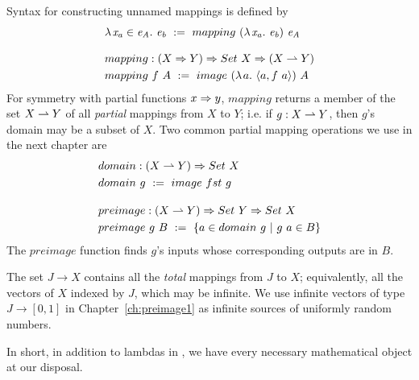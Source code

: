 Syntax for constructing unnamed mappings is defined by
\begin{align}
	&\fun{\mathit{x_a} \in \mathit{e_A}}{\mathit{e_b}} \ :=\ mapping~(\fun{\mathit{x_a}}\mathit{e_b})~\mathit{e_A} \\
\nonumber\\[-0.5\baselineskip]
	&\begin{aligned}
		&mapping : (X \tto Y) \tto Set~X \tto (X \pto Y) \\
		&mapping~f~A \ := \ image~(\fun{a}{\pair{a,f~a}})~A
	\end{aligned}
\end{align}
For symmetry with partial functions $x \Rightarrow y$, $mapping$ returns a member of the set $X \rightharpoonup Y$ of all \emph{partial} mappings from $X$ to $Y$; i.e. if $g : X \rightharpoonup Y$, then $g$'s domain may be a subset of $X$.
Two common partial mapping operations we use in the next chapter are
\begin{align}
	&\begin{aligned}
		&domain : (X \rightharpoonup Y) \Rightarrow Set~X \\
		&domain~g \ := \ image~fst~g
	\end{aligned} \\
\nonumber\\[-0.5\baselineskip]
	&\begin{aligned}
		&preimage : (X \rightharpoonup Y) \Rightarrow Set~Y \Rightarrow Set~X \\
		&preimage~g~B \ :=\ \lbrace {a \in domain~g} \ \lvert\ {g~a \in B} \rbrace
	\end{aligned}
\end{align}
The $preimage$ function finds $g$'s inputs whose corresponding outputs are in $B$.

The set $J \to X$ contains all the \emph{total} mappings from $J$ to $X$; equivalently, all the vectors of $X$ indexed by $J$, which may be infinite.
We use infinite vectors of type $J \to [0,1]$ in Chapter~\ref{ch:preimage1} as infinite sources of uniformly random numbers.

In short, in addition to lambdas in \lzfclang, we have every necessary mathematical object at our disposal.

